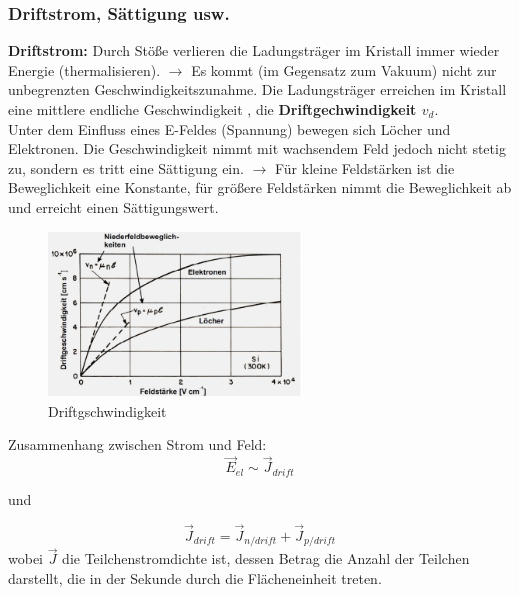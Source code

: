 	\subsubsection{Driftstrom, Sättigung usw.}
		\textbf{Driftstrom:}
		Durch Stöße verlieren die Ladungsträger im Kristall immer wieder Energie (thermalisieren). $\rightarrow$ Es kommt (im Gegensatz zum Vakuum) nicht zur unbegrenzten Geschwindigkeitszunahme.
		Die Ladungsträger erreichen im Kristall eine mittlere endliche Geschwindigkeit , die \textbf{Driftgechwindigkeit $v_d$}.\\
		Unter dem Einfluss eines E-Feldes (Spannung) bewegen sich Löcher und Elektronen. Die Geschwindigkeit nimmt mit wachsendem Feld jedoch nicht stetig zu, sondern es tritt eine Sättigung ein. $\rightarrow$ Für kleine Feldstärken ist die Beweglichkeit eine Konstante, für größere Feldstärken nimmt die Beweglichkeit ab und erreicht einen Sättigungswert.
		
		\begin{figure}[h!]
			\centering
			\includegraphics[width=0.6\textwidth]{Kapitel/Kap04/driftgeschwindigkeit.png}
			\caption{Driftgschwindigkeit}
			\label{04_driftGeschw}
		\end{figure}
		
		Zusammenhang zwischen Strom und Feld:\\
		\begin{equation*}
			\vec{E}_{el} \sim \vec{J}_{drift}
		\end{equation*}
		
		und
		
		\begin{equation}
			\vec{J}_{drift} = \vec{J}_{n/drift} + \vec{J}_{p/drift}
		\end{equation}
		wobei $\vec{J}$ die Teilchenstromdichte ist, dessen Betrag die Anzahl der Teilchen darstellt, die in der Sekunde durch die Flächeneinheit treten.
		
